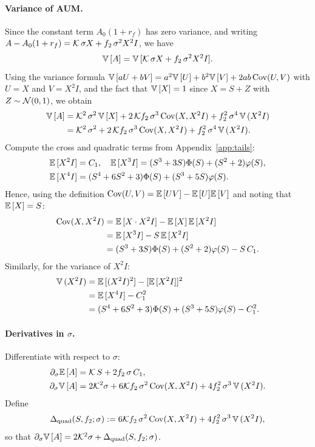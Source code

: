 \paragraph{Variance of AUM.}
Since the constant term $A_0(1+r_f)$ has zero variance, and writing $A - A_0(1+r_f) = \mathcal{K}\,\sigma X + f_2\,\sigma^2 X^2 I$, we have
\[
{\mathbb{V}}\,[A] = {\mathbb{V}}\,[\mathcal{K}\,\sigma X + f_2\,\sigma^2 X^2 I].
\]
Using the variance formula ${\mathbb{V}}\,[aU+bV]=a^2{\mathbb{V}}\,[U]+b^2{\mathbb{V}}\,[V]+2ab\,{\mathrm{Cov}}(U,V)$ with $U=X$ and $V=X^2 I$, and the fact that ${\mathbb{V}}\,[X]=1$ since $X=S+Z$ with $Z\sim\mathcal{N}(0,1)$, we obtain
\begin{align}
{\mathbb{V}}\,[A] &= \mathcal{K}^2\,\sigma^2\,{\mathbb{V}}\,[X] + 2\,\mathcal{K} f_2\,\sigma^3\,{\mathrm{Cov}}(X, X^2 I) + f_2^2\,\sigma^4\,{\mathbb{V}}\,(X^2 I) \nonumber\\
&= \mathcal{K}^2\,\sigma^2 + 2\,\mathcal{K} f_2\,\sigma^3\,{\mathrm{Cov}}(X, X^2 I) + f_2^2\,\sigma^4\,{\mathbb{V}}\,(X^2 I).\label{eq:VarA}
\end{align}
Compute the cross and quadratic terms from Appendix~\ref{app:tails}:
\begin{align}
{\mathbb{E}}\,[X^2 I] &= C_1,\quad {\mathbb{E}}\,[X^3 I] = (S^3+3S)\Phi(S) + (S^2+2)\varphi(S),\label{eq:X3}\\
{\mathbb{E}}\,[X^4 I] &= (S^4+6S^2+3)\Phi(S) + (S^3+5S)\varphi(S).\label{eq:X4}
\end{align}
Hence, using the definition ${\mathrm{Cov}}(U,V)={\mathbb{E}}\,[UV]-{\mathbb{E}}\,[U]{\mathbb{E}}\,[V]$ and noting that ${\mathbb{E}}\,[X]=S$:
\begin{align}
{\mathrm{Cov}}(X, X^2 I) &= {\mathbb{E}}\,[X \cdot X^2 I] - {\mathbb{E}}\,[X]\,{\mathbb{E}}\,[X^2 I] \nonumber\\
&= {\mathbb{E}}\,[X^3 I] - S\,{\mathbb{E}}\,[X^2 I] \nonumber\\
&= (S^3+3S)\Phi(S) + (S^2+2)\varphi(S) - S\,C_1.\label{eq:Cov}
\end{align}
Similarly, for the variance of $X^2 I$:
\begin{align}
{\mathbb{V}}\,(X^2 I) &= {\mathbb{E}}\,[(X^2 I)^2] - [{\mathbb{E}}\,[X^2 I]]^2 \nonumber\\
&= {\mathbb{E}}\,[X^4 I] - C_1^2 \nonumber\\
&= (S^4+6S^2+3)\Phi(S) + (S^3+5S)\varphi(S) - C_1^2.\label{eq:VarX2I}
\end{align}

\paragraph{Derivatives in $\sigma$.}
Differentiate with respect to $\sigma$:
\begin{align}
\partial_\sigma {\mathbb{E}}\,[A] &= \mathcal{K}\,S + 2 f_2\,\sigma\,C_1,\label{eq:dEA}\\
\partial_\sigma {\mathbb{V}}\,[A] &= 2\mathcal{K}^2\sigma + 6\mathcal{K} f_2\,\sigma^2\,{\mathrm{Cov}}(X, X^2 I) + 4 f_2^2\,\sigma^3\,{\mathbb{V}}\,(X^2 I).\label{eq:dVarA}
\end{align}
Define
\begin{equation}
\Delta_{\text{quad}}(S,f_2;\sigma):=6\mathcal{K} f_2\,\sigma^2\,{\mathrm{Cov}}(X, X^2 I) + 4 f_2^2\,\sigma^3\,{\mathbb{V}}\,(X^2 I),\label{eq:DeltaQuad}
\end{equation}
so that $\partial_\sigma {\mathbb{V}}\,[A]=2\mathcal{K}^2\sigma+\Delta_{\text{quad}}(S,f_2;\sigma)$.

